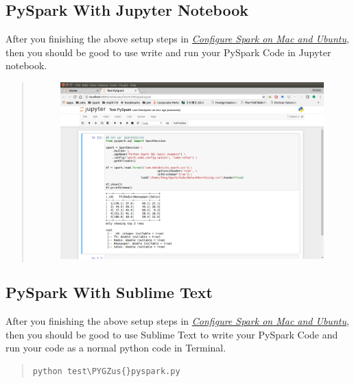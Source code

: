 \documentclass[letterpaper,11pt,english]{sphinxmanual}
\def\PYGZus{\char`\_}
\begin{document}
\subsection{PySpark With Jupyter Notebook}
\label{setup:pyspark-with-jupyter-notebook}
After you finishing the above setup steps in {\hyperref[setup:set-up-ubuntu]{\emph{Configure Spark on Mac and Ubuntu}}},
then you should be good to use write and run your PySpark Code
in Jupyter notebook.
\begin{quote}
\begin{figure}[htbp]
\centering

\includegraphics{jupyterWithPySpark.png}
\label{setup:fig-jupyterwithpyspark}\end{figure}
\end{quote}


\subsection{PySpark With Sublime Text}
\label{setup:pyspark-with-sublime-text}
After you finishing the above setup steps in {\hyperref[setup:set-up-ubuntu]{\emph{Configure Spark on Mac and Ubuntu}}},
then you should be good to use Sublime Text to write your PySpark
Code and run your code as a normal python code in Terminal.
\begin{quote}

\begin{Verbatim}[commandchars=\\\{\}]
python test\PYGZus{}pyspark.py
\end{Verbatim}
\end{quote}
\end{document}
